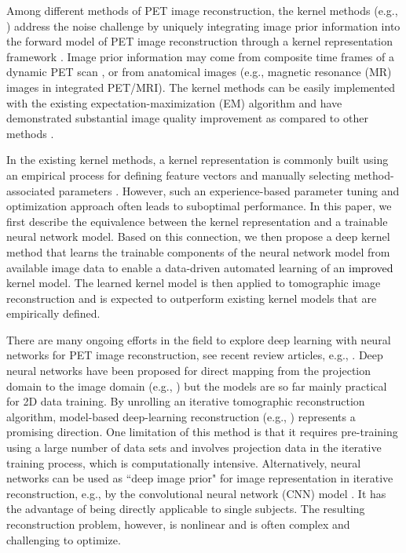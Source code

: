 \documentclass[]{IEEETran}
\newcommand{\txtb}[1]{\textcolor{black}{#1}}
\begin{document}
	Among different methods of PET image reconstruction, the kernel methods (e.g., \cite{Wang2015, Hutchcroft2016, Novosad2016, Wang2019,Bland2018,Deidda2019, Cheng2021}) address the noise challenge by uniquely integrating image prior information into the forward model of PET image reconstruction through a kernel representation framework \cite{Wang2015}. Image prior information may come from composite time frames of a dynamic PET scan \cite{Wang2015}, or from anatomical images (e.g., magnetic resonance (MR) images \cite{Hutchcroft2016, Novosad2016} in integrated PET/MRI). The kernel methods can be easily  implemented with the existing expectation-maximization (EM) algorithm and have demonstrated substantial image quality improvement as compared to other methods  \cite{Wang2015, Hutchcroft2016, Novosad2016}.
	
	In the existing kernel methods, a kernel representation is commonly built using an empirical process for defining feature vectors and manually selecting method-associated parameters \cite{Wang2015}. However, such an experience-based parameter tuning and optimization approach often leads to suboptimal performance. 
	In this paper, we first describe the equivalence between the kernel representation and a trainable neural network model. Based on this connection, we then propose a deep kernel method that learns the trainable components of the neural network model from available image data to enable a data-driven automated learning of an \txtb{improved} kernel model. The learned kernel model is then applied to tomographic image reconstruction and is expected to outperform existing kernel models that are empirically defined. 
	
	There are many ongoing efforts in the field to explore deep learning with neural networks for PET image reconstruction, see recent review articles, e.g.,  \cite{Reader2021, Gong2020, Wang2020, Ge2020, Ge2021, Gong2021a}. Deep neural networks have been proposed for direct mapping from the projection domain to the image domain (e.g., \cite{Haggstrom2019}) but the models are so far mainly practical for 2D data training. By unrolling an iterative tomographic reconstruction algorithm, model-based deep-learning reconstruction (e.g., \cite{Lim2020, Mehranian2020}) represents a promising direction. One limitation of this method is that it requires pre-training using a large number of data sets and involves projection data in the iterative training process, which is computationally intensive. Alternatively, neural networks can be used as ``deep image prior" for image representation in iterative reconstruction, e.g., by the convolutional neural network (CNN) model \cite{Gong2019, Gong2019a, Gong2022, Xie2020, Yokota2019, Xie2021}. It has the advantage of being directly applicable to single subjects. The resulting reconstruction problem, however, is nonlinear and is often complex and challenging to optimize. 
	
\end{document}
